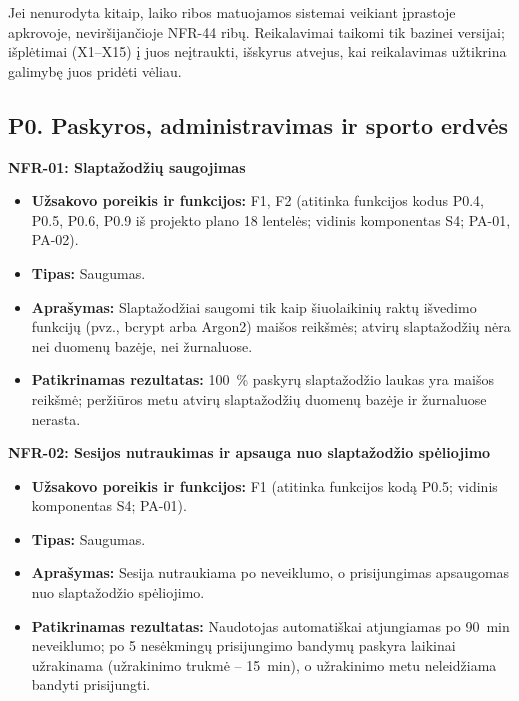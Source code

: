 Jei nenurodyta kitaip, laiko ribos matuojamos sistemai veikiant įprastoje apkrovoje, neviršijančioje NFR-44 ribų. Reikalavimai taikomi tik bazinei versijai; išplėtimai (X1--X15) į juos neįtraukti, išskyrus atvejus, kai reikalavimas užtikrina galimybę juos pridėti vėliau.

\subsection{P0. Paskyros, administravimas ir sporto erdvės}

\noindent\textbf{NFR-01: Slaptažodžių saugojimas}
\begin{itemize}
    \item \textbf{Užsakovo poreikis ir funkcijos:} F1, F2 (atitinka funkcijos kodus P0.4, P0.5, P0.6, P0.9 iš projekto plano 18 lentelės; vidinis komponentas S4; PA-01, PA-02).
    \item \textbf{Tipas:} Saugumas.
    \item \textbf{Aprašymas:} Slaptažodžiai saugomi tik kaip šiuolaikinių raktų išvedimo funkcijų (pvz., bcrypt arba Argon2) maišos reikšmės; atvirų slaptažodžių nėra nei duomenų bazėje, nei žurnaluose.
    \item \textbf{Patikrinamas rezultatas:} 100~\% paskyrų slaptažodžio laukas yra maišos reikšmė; peržiūros metu atvirų slaptažodžių duomenų bazėje ir žurnaluose nerasta.
\end{itemize}

\noindent\textbf{NFR-02: Sesijos nutraukimas ir apsauga nuo slaptažodžio spėliojimo}
\begin{itemize}
    \item \textbf{Užsakovo poreikis ir funkcijos:} F1 (atitinka funkcijos kodą P0.5; vidinis komponentas S4; PA-01).
    \item \textbf{Tipas:} Saugumas.
    \item \textbf{Aprašymas:} Sesija nutraukiama po neveiklumo, o prisijungimas apsaugomas nuo slaptažodžio spėliojimo.
    \item \textbf{Patikrinamas rezultatas:} Naudotojas automatiškai atjungiamas po 90~min neveiklumo; po 5 nesėkmingų prisijungimo bandymų paskyra laikinai užrakinama (užrakinimo trukmė -- 15~min), o užrakinimo metu neleidžiama bandyti prisijungti.
\end{itemize}

